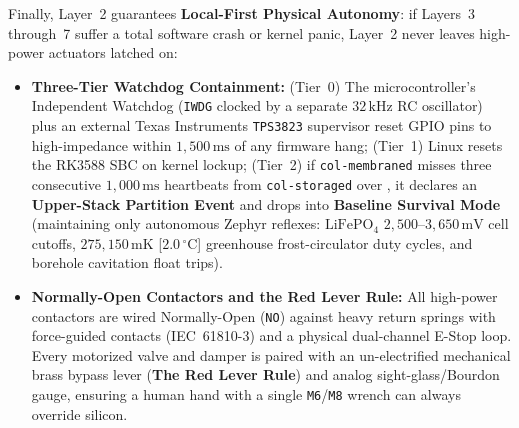 Finally, Layer~2 guarantees \textbf{Local-First Physical Autonomy}: if Layers~3 through~7 suffer a total software crash or kernel panic, Layer~2 never leaves high-power actuators latched on:
\begin{itemize}
    \item \textbf{Three-Tier Watchdog Containment:} (Tier~0) The microcontroller's Independent Watchdog (\texttt{IWDG} clocked by a separate $32\,\mathrm{kHz}$ RC oscillator) plus an external Texas Instruments \texttt{TPS3823} supervisor reset GPIO pins to high-impedance within $1{,}500\,\mathrm{ms}$ of any firmware hang; (Tier~1) Linux  resets the RK3588 SBC on kernel lockup; (Tier~2) if \texttt{col-membraned} misses three consecutive $1{,}000\,\mathrm{ms}$ heartbeats from \texttt{col-storaged} over , it declares an \textbf{Upper-Stack Partition Event} and drops into \textbf{Baseline Survival Mode} (maintaining only autonomous Zephyr reflexes: $\mathrm{LiFePO_4}$ $2{,}500\text{--}3{,}650\,\mathrm{mV}$ cell cutoffs, $275{,}150\,\mathrm{mK}$ [$2.0\,^\circ\mathrm{C}$] greenhouse frost-circulator duty cycles, and borehole cavitation float trips).
    \item \textbf{Normally-Open Contactors and the Red Lever Rule:} All high-power contactors are wired Normally-Open (\texttt{NO}) against heavy return springs with force-guided contacts (IEC~61810-3) \parencite{iec61810_3} and a physical dual-channel E-Stop loop. Every motorized valve and damper is paired with an un-electrified mechanical brass bypass lever (\textbf{The Red Lever Rule}) and analog sight-glass/Bourdon gauge, ensuring a human hand with a single \texttt{M6}/\texttt{M8} wrench can always override silicon.
\end{itemize}
